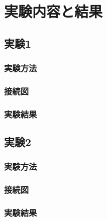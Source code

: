 \section{実験内容と結果}
\subsection{実験1}
\subsubsection{実験方法}

\subsubsection{接続図}

\subsubsection{実験結果}


\subsection{実験2}
\subsubsection{実験方法}

\subsubsection{接続図}

\subsubsection{実験結果}

